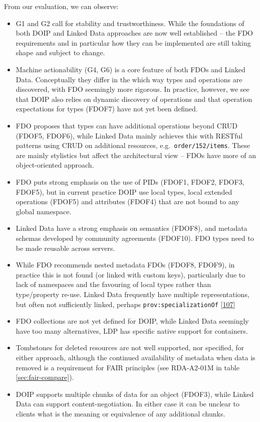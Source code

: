 From our evaluation, we can observe:

\begin{itemize}
\tightlist
\item
  G1 and G2 call for stability and trustworthiness. While the foundations of both DOIP and Linked Data approaches are now well established -- the FDO requirements and in particular how they can be implemented are still taking shape and subject to change.
\item
  Machine actionability (G4, G6) is a core feature of both FDOs and Linked Data. Conceptually they differ in the which way types and operations are discovered, with FDO seemingly more rigorous. In practice, however, we see that DOIP also relies on dynamic discovery of operations and that operation expectations for types (FDOF7) have not yet been defined.
\item
  FDO proposes that types can have additional operations beyond CRUD (FDOF5, FDOF6), while Linked Data mainly achieves this with RESTful patterns using CRUD on additional resources, e.g.~\texttt{order/152/items}. These are mainly stylistics but affect the architectural view -- FDOs have more of an object-oriented approach.
\item
  FDO puts strong emphasis on the use of PIDs (FDOF1, FDOF2, FDOF3, FDOF5), but in current practice DOIP use local types, local extended operations (FDOF5) and attributes (FDOF4) that are not bound to any global namespace.
\item
  Linked Data have a strong emphasis on semantics (FDOF8), and metadata schemas developed by community agreements (FDOF10). FDO types need to be made reusable across servers.
\item
  While FDO recommends nested metadata FDOs (FDOF8, FDOF9), in practice this is not found (or linked with custom keys), particularly due to lack of namespaces and the favouring of local types rather than type/property re-use. Linked Data frequently have multiple representations, but often not sufficiently linked, perhaps \texttt{prov:specializationOf} {[}\protect\hyperlink{ref-9T4j3N4e}{107}{]}
\item
  FDO collections are not yet defined for DOIP, while Linked Data seemingly have too many alternatives, LDP has specific native support for containers.
\item
  Tombstones for deleted resources are not well supported, nor specified, for either approach, although the continued availability of metadata when data is removed is a requirement for FAIR principles (see RDA-A2-01M in table \ref{sec:fair-compare}).
\item
  DOIP supports multiple chunks of data for an object (FDOF3), while Linked Data can support content-negotiation. In either case it can be unclear to clients what is the meaning or equivalence of any additional chunks.
\end{itemize}

